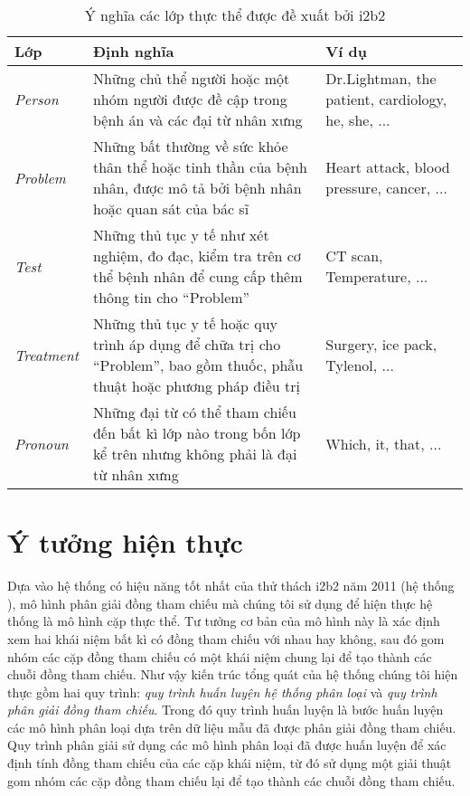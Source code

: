 \begin{table}[th]
\centering{}
\caption{Ý nghĩa các lớp thực thể được đề xuất bởi i2b2\label{tab:EntityLabels}}
\footnotesize\sffamily

\begin{tabularx}{\textwidth}{@{}lLP{\colleft}{0.3}@{}}
\toprule
\textbf{Lớp} & \textbf{Định nghĩa} & \textbf{Ví dụ}\\
\midrule
\emph{Person} & Những chủ thể người hoặc một nhóm người được đề cập trong bệnh án và các đại từ nhân xưng & Dr.Lightman, the patient, cardiology, he, she, ...\\
\emph{Problem} & Những bất thường về sức khỏe thân thể hoặc tinh thần của bệnh nhân, được mô tả bởi bệnh nhân hoặc quan sát của bác sĩ & Heart attack, blood pressure, cancer, ...\\
\emph{Test} & Những thủ tục y tế như xét nghiệm, đo đạc, kiểm tra trên cơ thể bệnh nhân để cung cấp thêm thông tin cho ``Problem'' & CT scan, Temperature, ...\\
\emph{Treatment} & Những thủ tục y tế hoặc quy trình áp dụng để chữa trị cho ``Problem'', bao gồm thuốc, phẫu thuật hoặc phương pháp điều trị & Surgery, ice pack, Tylenol, ...\\
\emph{Pronoun} & Những đại từ có thể tham chiếu đến bất kì lớp nào trong bốn lớp kể trên nhưng không phải là đại từ nhân xưng & Which, it, that, ...\\
\bottomrule
\end{tabularx}
\end{table}

\section{Ý tưởng hiện thực\label{ytuonghienthuc}}
Dựa vào hệ thống có hiệu năng tốt nhất của thử thách i2b2 năm 2011 (hệ thống \cite{YanXu2012}), mô hình phân giải đồng tham chiếu mà chúng tôi sử dụng để hiện thực hệ thống là mô hình cặp thực thể. Tư tưởng cơ bản của mô hình này là xác định xem hai khái niệm bất kì có đồng tham chiếu với nhau hay không, sau đó gom nhóm các cặp đồng tham chiếu có một khái niệm chung lại để tạo thành các chuỗi đồng tham chiếu. Như vậy kiến trúc tổng quát của hệ thống chúng tôi hiện thực gồm hai quy trình: \emph{quy trình huấn luyện hệ thống phân loại} và \emph{quy trình phân giải đồng tham chiếu}. Trong đó quy trình huấn luyện là bước huấn luyện các mô hình phân loại dựa trên dữ liệu mẫu đã được phân giải đồng tham chiếu. Quy trình phân giải sử dụng các mô hình phân loại đã được huấn luyện để xác định tính đồng tham chiếu của các cặp khái niệm, từ đó sử dụng một giải thuật gom nhóm các cặp đồng tham chiếu lại để tạo thành các chuỗi đồng tham chiếu.

